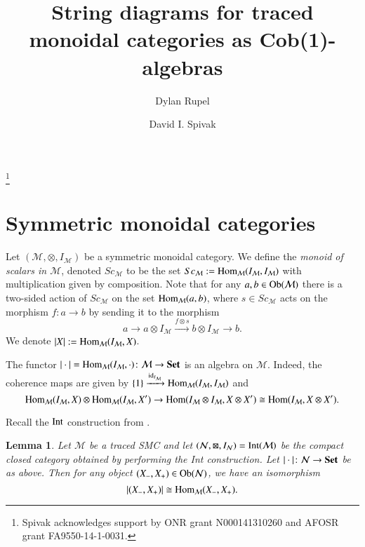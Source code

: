 \documentclass{amsart}
\def\tn{\textnormal}
\def\mc{\mathcal}
\def\Hom{\tn{Hom}}
\def\Ob{\tn{Ob}}
\def\to{\rightarrow}
\def\taking{\colon}
\def\iso{\cong}
\newcommand{\To}[1]{\xrightarrow{#1}}
\def\id{\tn{id}}
\def\Set{{\bf Set}}
\def\mcM{\mc{M}}
\def\mcN{\mc{N}}
\def\Int{\tn{Int}}
\newtheorem{lemma}[subsubsection]{Lemma}
\theoremstyle{remark}
\theoremstyle{definition}
\begin{document}
\title{String diagrams for traced monoidal categories as Cob(1)-algebras}

\author{Dylan Rupel}
\address{Northeastern University\\360 Huntington Ave.\\Boston, MA 02115}

\author{David I. Spivak}
\address{Massachusetts Institute of Technology\\77 Massachusetts Ave.\\Cambridge, MA 02139}

\thanks{Spivak acknowledges support by ONR grant N000141310260 and AFOSR grant FA9550-14-1-0031.}


\maketitle

\tableofcontents

\section{Symmetric monoidal categories}

Let $(\mcM,\otimes,I_\mcM)$ be a symmetric monoidal category. We define the {\em monoid of scalars in $\mcM$}, denoted $Sc_\mcM$ to be the set $Sc_\mcM:=\Hom_\mcM(I_\mcM,I_\mcM)$ with multiplication given by composition. Note that for any $a,b\in\Ob(\mcM)$ there is a two-sided action of $Sc_\mcM$ on the set $\Hom_\mcM(a,b)$, where $s\in Sc_\mcM$ acts on the morphism $f\taking a\to b$ by sending it to the morphism 
$$a\to a\otimes I_\mcM\To{f\otimes s}b\otimes I_\mcM\to b.$$
We denote $|X|:=\Hom_\mcM(I_\mcM,X)$.

The functor $|\cdot|=\Hom_\mcM(I_\mcM,\cdot)\taking\mcM\to\Set$ is an algebra on $\mcM$. Indeed, the coherence maps are given by $\{1\}\To{\id_{I_\mcM}}\Hom_\mcM(I_\mcM,I_\mcM)$ and 
$$\Hom_\mcM(I_\mcM,X)\otimes\Hom_\mcM(I_\mcM,X')\to\Hom(I_\mcM\otimes I_\mcM,X\otimes X')\iso\Hom(I_\mcM,X\otimes X').$$ 

Recall the $\Int$ construction from \cite{JoyalStreetVerity}.

\begin{lemma}

Let $\mcM$ be a traced SMC and let $(\mcN,\boxtimes,I_\mcN)=\Int(\mcM)$ be the compact closed category obtained by performing the Int construction. Let $|\cdot|\taking\mcN\to\Set$ be as above. Then for any object $(X_-,X_+)\in\Ob(\mcN)$, we have an isomorphism
$$|(X_-,X_+)|\iso\Hom_\mcM(X_-,X_+).$$

\end{lemma}
\end{document}
